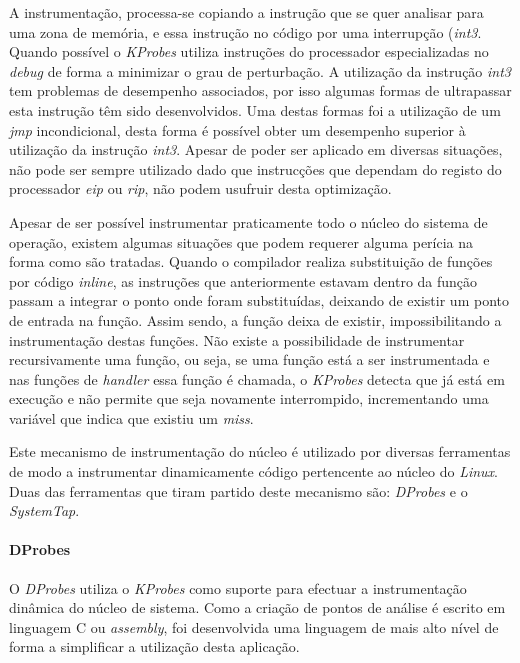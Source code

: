 A instrumentação, processa-se copiando a instrução que se quer analisar para uma zona de memória, e essa instrução no código por uma interrupção (\textit{int3}.
Quando possível o \textit{KProbes} utiliza instruções do processador especializadas no \textit{debug} de forma a minimizar o grau de perturbação.
A utilização da instrução \textit{int3} tem problemas de desempenho associados, por isso algumas formas de ultrapassar esta instrução têm sido desenvolvidos.
Uma destas formas foi a utilização de um \textit{jmp} incondicional, desta forma é possível obter um desempenho superior à utilização da instrução \textit{int3}.
Apesar de poder ser aplicado em diversas situações, não pode ser sempre utilizado dado que instrucções que dependam do registo do processador \textit{eip} ou \textit{rip}, não podem usufruir desta optimização.

Apesar de ser possível instrumentar praticamente todo o núcleo do sistema de operação, existem algumas situações que podem requerer alguma perícia na forma como são tratadas.
Quando o compilador realiza substituição de funções por código \textit{inline}, as instruções que anteriormente estavam dentro da função passam a integrar o ponto onde foram substituídas, deixando de existir um ponto de entrada na função.
Assim sendo, a função deixa de existir, impossibilitando a instrumentação destas funções.
Não existe a possibilidade de instrumentar recursivamente uma função, ou seja, se uma função está a ser instrumentada e nas funções de \textit{handler} essa função é chamada, o \textit{KProbes} detecta que já está em execução e não permite que seja novamente interrompido, incrementando uma variável que indica que existiu um \textit{miss}.

Este mecanismo de instrumentação do núcleo é utilizado por diversas ferramentas de modo a instrumentar dinamicamente código pertencente ao núcleo do \textit{Linux}.
Duas das ferramentas que tiram partido deste mecanismo são: \textit{DProbes} e o \textit{SystemTap}.

\paragraph*{DProbes}
O \textit{DProbes} utiliza o \textit{KProbes} como suporte para efectuar a instrumentação dinâmica do núcleo de sistema.
Como a criação de pontos de análise é escrito em linguagem C ou \textit{assembly}, foi desenvolvida uma linguagem de mais alto nível de forma a simplificar a utilização desta aplicação.

